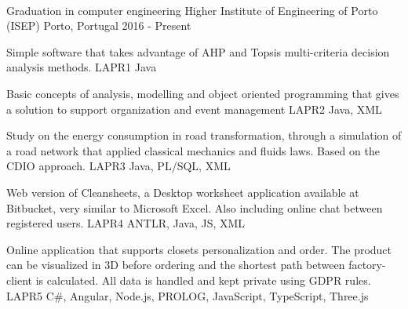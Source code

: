 \documentclass[]{awesome-cv}
\begin{document}
\begin{center}
	  \\
	
\end{center}

\vspace{-2mm}
\begin{cventries}
	\cventry
	{Graduation in computer engineering}
	{Higher Institute of Engineering of Porto (ISEP)}
	{Porto, Portugal}
	{2016 - Present}
	{}
\end{cventries}

\vspace{-5mm}
\begin{cventries}
 	\cventry
	{Simple software that takes advantage of AHP and Topsis multi-criteria decision analysis methods.}
	{LAPR1}
	{Java}
	{}
	{}
	
	\vspace{-5mm}
	\cventry
	{Basic concepts of analysis, modelling and object oriented programming 
	that gives a solution to support organization and event management}
	{LAPR2}
	{Java, XML}
	{}
	{}
	
	\vspace{-5mm}
	\cventry
	{Study on the energy consumption in road
	transformation, through a simulation of a road network that
	applied classical mechanics and fluids laws. Based on the CDIO approach.}
	{LAPR3}
	{Java, PL/SQL, XML}
	{}
	{}
	
	\vspace{-5mm}
	\cventry
	{Web version of Cleansheets, a Desktop worksheet application available at Bitbucket,
	very similar to Microsoft Excel. Also including online chat between registered users.}
	{LAPR4}
	{ANTLR, Java, JS, XML}
	{}
	{}

	\vspace{-5mm}
	\cventry
	{Online application that supports closets personalization and order.
	 The product can be visualized in 3D before ordering and the shortest path 
	 between factory-client is calculated. All data is handled and kept private using GDPR rules.}
	{LAPR5}
	{C\#, Angular, Node.js, PROLOG, JavaScript, TypeScript, Three.js}
	{}
	{}
\end{cventries}
\end{document}
